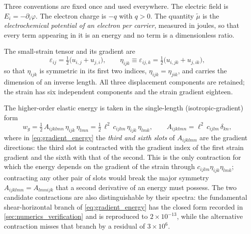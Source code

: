 Three conventions are fixed once and used everywhere.  The electric field is
$E_i=-\partial_i\varphi$.  The electron charge is $-q$ with $q>0$.  The
quantity $\widetilde\mu$ is the \emph{electrochemical potential of an electron
per carrier}, measured in joules, so that every term appearing in it is an
energy and no term is a dimensionless ratio.


The small-strain tensor and its gradient are
\begin{equation}
\label{eq:strain}
\varepsilon_{ij}=\tfrac12\bigl(u_{i,j}+u_{j,i}\bigr),
\qquad
\eta_{ijk}\equiv\varepsilon_{ij,k}=\tfrac12\bigl(u_{i,jk}+u_{j,ik}\bigr),
\end{equation}
so that $\eta_{ijk}$ is symmetric in its first two indices,
$\eta_{ijk}=\eta_{jik}$, and carries the dimension of an inverse length.
All three displacement components are retained; the strain has six independent
components and the strain gradient eighteen.

The higher-order elastic energy is taken in the single-length
(isotropic-gradient) form
\begin{equation}
\label{eq:gradient_energy}
w_g=\tfrac12\,A_{ijklmn}\,\eta_{ijk}\,\eta_{lmn}
=\tfrac12\,\ell^{2}\,c_{ijlm}\,\eta_{ijk}\,\eta_{lmk},
\qquad
A_{ijklmn}=\ell^{2}\,c_{ijlm}\,\delta_{kn},
\end{equation}
where in \eqref{eq:gradient_energy} the \emph{third and sixth slots} of
$A_{ijklmn}$ are the gradient directions: the third slot is contracted with the
gradient index of the first strain gradient and the sixth with that of the
second.  This is the only contraction for which the energy depends on the
gradient of the strain through $c_{ijlm}\eta_{ijk}\eta_{lmk}$; contracting any
other pair of slots would break the major symmetry
$A_{ijklmn}=A_{lmnijk}$ that a second derivative of an energy must possess.  The two candidate contractions are also distinguishable by their spectra: the
fundamental shear-horizontal branch of \eqref{eq:gradient_energy} has the closed
form recorded in \cref{sec:numerics_verification} and is reproduced to
$2\times10^{-13}$, while the alternative contraction misses that branch by a
residual of $3\times10^{6}$.

